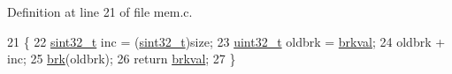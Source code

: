 Definition at line 21 of file mem.\+c.


\begin{DoxyCode}
21                         \{
22     \hyperlink{a00134_ad838970452fe561cb8e0550cac5336be_ad838970452fe561cb8e0550cac5336be}{sint32\_t} inc = (\hyperlink{a00134_ad838970452fe561cb8e0550cac5336be_ad838970452fe561cb8e0550cac5336be}{sint32\_t})size;
23     \hyperlink{a00134_a435d1572bf3f880d55459d9805097f62_a435d1572bf3f880d55459d9805097f62}{uint32\_t} oldbrk = \hyperlink{a00161_a33fb44061f3432e7d04085bcef339974_a33fb44061f3432e7d04085bcef339974}{brkval};
24     oldbrk + inc;
25     \hyperlink{a00161_a46e79822750a4396759664ee0012b283_a46e79822750a4396759664ee0012b283}{brk}(oldbrk);
26     \textcolor{keywordflow}{return} \hyperlink{a00161_a33fb44061f3432e7d04085bcef339974_a33fb44061f3432e7d04085bcef339974}{brkval};
27 \}
\end{DoxyCode}
